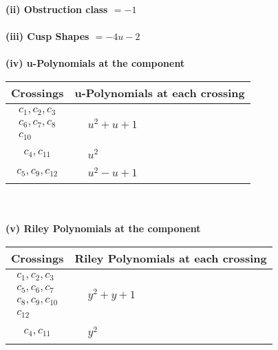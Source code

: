 \documentclass[1p]{elsarticle_modified}
\theoremstyle{definition}
\begin{document}
\flushleft \textbf{(ii) Obstruction class $= -1$}\\~\\
\flushleft \textbf{(iii) Cusp Shapes $= -4 u-2$}\\~\\
\newpage\renewcommand{\arraystretch}{1}
\flushleft \textbf{(iv) u-Polynomials at the component}\newline \\
\begin{tabular}{m{50pt}|m{274pt}}
Crossings & \hspace{64pt}u-Polynomials at each crossing \\
\hline $$\begin{aligned}c_{1},c_{2},c_{3}\\c_{6},c_{7},c_{8}\\c_{10}\end{aligned}$$&$\begin{aligned}
&u^2+u+1
\end{aligned}$\\
\hline $$\begin{aligned}c_{4},c_{11}\end{aligned}$$&$\begin{aligned}
&u^2
\end{aligned}$\\
\hline $$\begin{aligned}c_{5},c_{9},c_{12}\end{aligned}$$&$\begin{aligned}
&u^2- u+1
\end{aligned}$\\
\hline
\end{tabular}\\~\\
\newpage\renewcommand{\arraystretch}{1}
\flushleft \textbf{(v) Riley Polynomials at the component}\newline \\
\begin{tabular}{m{50pt}|m{274pt}}
Crossings & \hspace{64pt}Riley Polynomials at each crossing \\
\hline $$\begin{aligned}c_{1},c_{2},c_{3}\\c_{5},c_{6},c_{7}\\c_{8},c_{9},c_{10}\\c_{12}\end{aligned}$$&$\begin{aligned}
&y^2+y+1
\end{aligned}$\\
\hline $$\begin{aligned}c_{4},c_{11}\end{aligned}$$&$\begin{aligned}
&y^2
\end{aligned}$\\
\hline
\end{tabular}\\~\\
\end{document}
